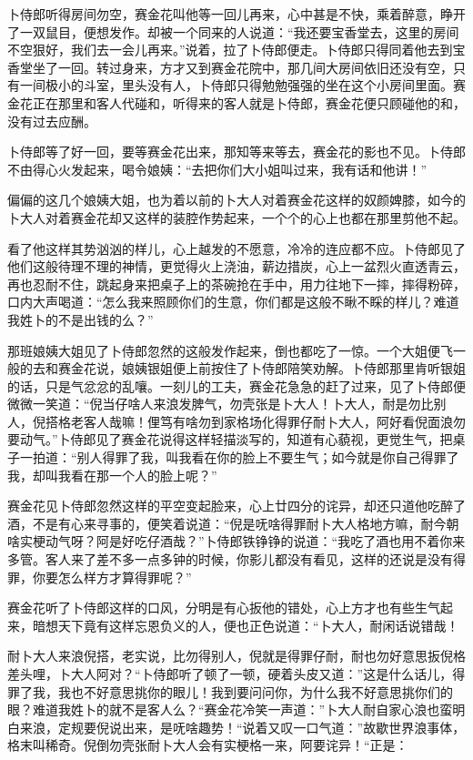 \documentclass[12pt,UTF8]{ctexbook}
\begin{document}
{{{卜侍郎听得房间勿空，赛金花叫他等一回儿再来，心中甚是不快，乘着醉意，睁开了一双鼠目，便想发作。却被一个同来的人说道：“我还要宝香堂去，这里的房间不空狠好，我们去一会儿再来。”说着，拉了卜侍郎便走。卜侍郎只得同着他去到宝香堂坐了一回。转过身来，方才又到赛金花院中，那几间大房间依旧还没有空，只有一间极小的斗室，里头没有人，卜侍郎只得勉勉强强的坐在这个小房间里面。赛金花正在那里和客人代碰和，听得来的客人就是卜侍郎，赛金花便只顾碰他的和，没有过去应酬。

卜侍郎等了好一回，要等赛金花出来，那知等来等去，赛金花的影也不见。卜侍郎不由得心火发起来，喝令娘姨：“去把你们大小姐叫过来，我有话和他讲！”

偏偏的这几个娘姨大姐，也为着以前的卜大人对着赛金花这样的奴颜婢膝，如今的卜大人对着赛金花却又这样的装腔作势起来，一个个的心上也都在那里剪他不起。

看了他这样其势汹汹的样儿，心上越发的不愿意，冷冷的连应都不应。卜侍郎见了他们这般待理不理的神情，更觉得火上浇油，薪边措炭，心上一盆烈火直透青云，再也忍耐不住，跳起身来把桌子上的茶碗抢在手中，用力往地下一摔，摔得粉碎，口内大声喝道：“怎么我来照顾你们的生意，你们都是这般不瞅不睬的样儿？难道我姓卜的不是出钱的么？”

那班娘姨大姐见了卜侍郎忽然的这般发作起来，倒也都吃了一惊。一个大姐便飞一般的去和赛金花说，娘姨银姐便上前按住了卜侍郎陪笑劝解。卜侍郎那里肯听银姐的话，只是气忿忿的乱嚷。一刻儿的工夫，赛金花急急的赶了过来，见了卜侍郎便微微一笑道：“倪当仔啥人来浪发脾气，勿壳张是卜大人！卜大人，耐是勿比别人，倪搭格老客人哉嘛！俚笃有啥勿到家格场化得罪仔耐卜大人，阿好看倪面浪勿要动气。”卜侍郎见了赛金花说得这样轻描淡写的，知道有心藐视，更觉生气，把桌子一拍道：“别人得罪了我，叫我看在你的脸上不要生气；如今就是你自己得罪了我，却叫我看在那一个人的脸上呢？”

赛金花见卜侍郎忽然这样的平空变起脸来，心上廿四分的诧异，却还只道他吃醉了酒，不是有心来寻事的，便笑着说道：“倪是呒啥得罪耐卜大人格地方嘛，耐今朝啥实梗动气呀？阿是好吃仔酒哉？”卜侍郎铁铮铮的说道：“我吃了酒也用不着你来多管。客人来了差不多一点多钟的时候，你影儿都没有看见，这样的还说是没有得罪，你要怎么样方才算得罪呢？”

赛金花听了卜侍郎这样的口风，分明是有心扳他的错处，心上方才也有些生气起来，暗想天下竟有这样忘恩负义的人，便也正色说道：“卜大人，耐闲话说错哉！

耐卜大人来浪倪搭，老实说，比勿得别人，倪就是得罪仔耐，耐也勿好意思扳倪格差头哩，卜大人阿对？“卜侍郎听了顿了一顿，硬着头皮又道：”这是什么话儿，得罪了我，我也不好意思挑你的眼儿！我到要问问你，为什么我不好意思挑你们的眼？难道我姓卜的就不是客人么？“赛金花冷笑一声道：”卜大人耐自家心浪也蛮明白来浪，定规要倪说出来，是呒啥趣势！“说着又叹一口气道：”故歇世界浪事体，格末叫稀奇。倪倒勿壳张耐卜大人会有实梗格一来，阿要诧异！“正是：

}}}
\end{document}
